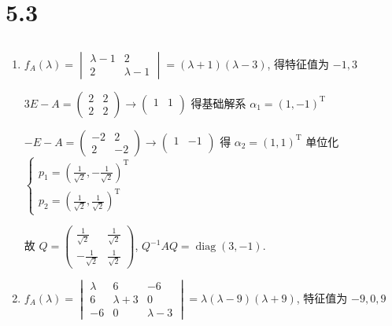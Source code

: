 \section{5.3}

 \subsection{} %

	 \paragraph{} %
		 \begin{enumerate}
			 \item %
			       \( f_{A}(\lambda) = \begin{vmatrix}
				       \lambda-1 & 2         \\
				       2         & \lambda-1
			       \end{vmatrix} = (\lambda+1)(\lambda-3) \), 得特征值为 \( -1, 3 \)

			       \( 3E-A = \begin{pmatrix}
				       2 & 2 \\
				       2 & 2
			       \end{pmatrix} \rightarrow \begin{pmatrix}
				       1 & 1 \\
				         &
			       \end{pmatrix} \) 得基础解系 \( \alpha_{1} = (1, -1)^{\mathrm{T}} \)

			       \( -E-A = \begin{pmatrix}
				       -2 & 2  \\
				       2  & -2
			       \end{pmatrix} \rightarrow \begin{pmatrix}
				       1 & -1 \\
				         &
			       \end{pmatrix} \) 得 \( \alpha_{2} = (1, 1)^{\mathrm{T}} \) 单位化 \( \begin{cases}
				       p_{1} = \left( \frac{1}{\sqrt{2}}, -\frac{1}{\sqrt{2}} \right)^{\mathrm{T}} \\
				       p_{2} = \left( \frac{1}{\sqrt{2}}, \frac{1}{\sqrt{2}} \right)^{\mathrm{T}}
			       \end{cases} \)

			       故 \( Q = \begin{pmatrix}
				       \frac{1}{\sqrt{2}}  & \frac{1}{\sqrt{2}} \\
				       -\frac{1}{\sqrt{2}} & \frac{1}{\sqrt{2}}
			       \end{pmatrix} \), \( Q^{-1}AQ = \operatorname{diag}(3, -1) \).
			 \item %
			       \( f_{A}(\lambda) = \begin{vmatrix}
				       \lambda & 6         & -6        \\
				       6       & \lambda+3 & 0         \\
				       -6      & 0         & \lambda-3
			       \end{vmatrix} = \lambda(\lambda-9)(\lambda+9) \), 特征值为 \( -9, 0, 9 \)


\end{enumerate}
